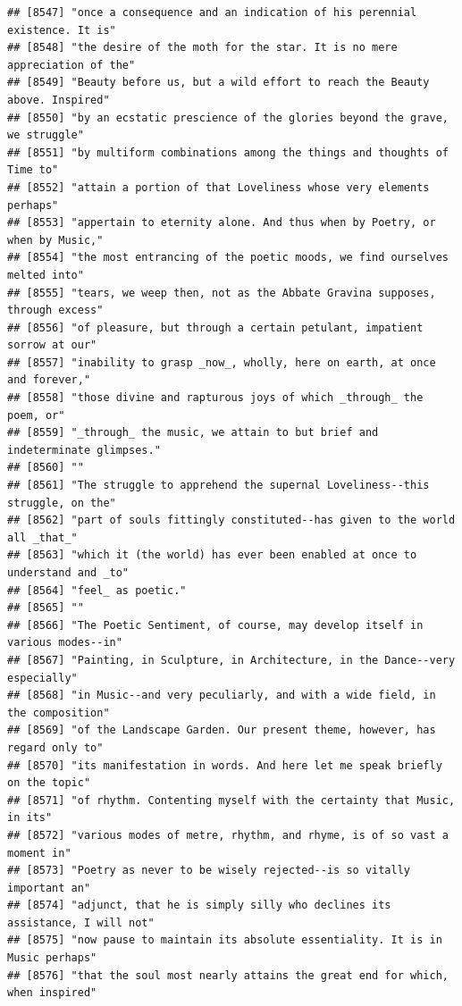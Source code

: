 \documentclass{article}\usepackage[]{graphicx}\usepackage[]{color}
\makeatletter
\newenvironment{kframe}{%
 \def\at@end@of@kframe{}%
 \ifinner\ifhmode%
  \def\at@end@of@kframe{\end{minipage}}%
  \begin{minipage}{\columnwidth}%
 \fi\fi%
 \def\FrameCommand##1{\hskip\@totalleftmargin \hskip-\fboxsep
 \colorbox{shadecolor}{##1}\hskip-\fboxsep
     \hskip-\linewidth \hskip-\@totalleftmargin \hskip\columnwidth}%
 \MakeFramed {\advance\hsize-\width
   \@totalleftmargin\z@ \linewidth\hsize
   \@setminipage}}%
 {\par\unskip\endMakeFramed%
 \at@end@of@kframe}
\newenvironment{knitrout}{}{} %
\makeatother
\begin{document}
\begin{knitrout}
\begin{kframe}
\begin{verbatim}
## [8547] "once a consequence and an indication of his perennial existence. It is"      
## [8548] "the desire of the moth for the star. It is no mere appreciation of the"      
## [8549] "Beauty before us, but a wild effort to reach the Beauty above. Inspired"     
## [8550] "by an ecstatic prescience of the glories beyond the grave, we struggle"      
## [8551] "by multiform combinations among the things and thoughts of Time to"          
## [8552] "attain a portion of that Loveliness whose very elements perhaps"             
## [8553] "appertain to eternity alone. And thus when by Poetry, or when by Music,"     
## [8554] "the most entrancing of the poetic moods, we find ourselves melted into"      
## [8555] "tears, we weep then, not as the Abbate Gravina supposes, through excess"     
## [8556] "of pleasure, but through a certain petulant, impatient sorrow at our"        
## [8557] "inability to grasp _now_, wholly, here on earth, at once and forever,"       
## [8558] "those divine and rapturous joys of which _through_ the poem, or"             
## [8559] "_through_ the music, we attain to but brief and indeterminate glimpses."     
## [8560] ""                                                                            
## [8561] "The struggle to apprehend the supernal Loveliness--this struggle, on the"    
## [8562] "part of souls fittingly constituted--has given to the world all _that_"      
## [8563] "which it (the world) has ever been enabled at once to understand and _to"    
## [8564] "feel_ as poetic."                                                            
## [8565] ""                                                                            
## [8566] "The Poetic Sentiment, of course, may develop itself in various modes--in"    
## [8567] "Painting, in Sculpture, in Architecture, in the Dance--very especially"      
## [8568] "in Music--and very peculiarly, and with a wide field, in the composition"    
## [8569] "of the Landscape Garden. Our present theme, however, has regard only to"     
## [8570] "its manifestation in words. And here let me speak briefly on the topic"      
## [8571] "of rhythm. Contenting myself with the certainty that Music, in its"          
## [8572] "various modes of metre, rhythm, and rhyme, is of so vast a moment in"        
## [8573] "Poetry as never to be wisely rejected--is so vitally important an"           
## [8574] "adjunct, that he is simply silly who declines its assistance, I will not"    
## [8575] "now pause to maintain its absolute essentiality. It is in Music perhaps"     
## [8576] "that the soul most nearly attains the great end for which, when inspired"    

\end{verbatim}
\end{kframe}
\end{knitrout}
\end{document}
